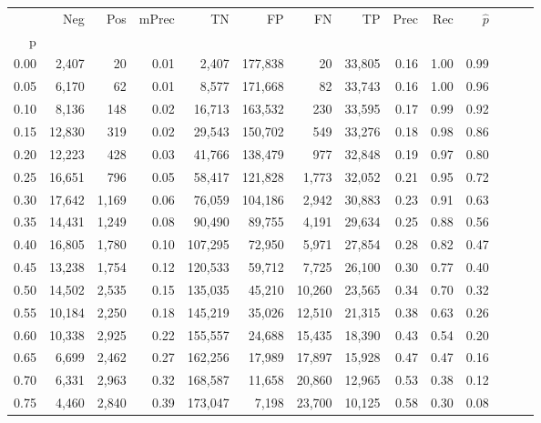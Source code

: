 \begin{tabular}{rrrrrrrrrrrrrr}
\toprule
{} &     Neg &    Pos & mPrec &       TN &       FP &      FN &      TP &  Prec &   Rec & $\hat{p}$ \\
p    &         &        &       &          &          &         &         &       &       &           \\
\midrule
0.00 &   2,407 &     20 &  0.01 &    2,407 &  177,838 &      20 &  33,805 &  0.16 &  1.00 &      0.99 \\
0.05 &   6,170 &     62 &  0.01 &    8,577 &  171,668 &      82 &  33,743 &  0.16 &  1.00 &      0.96 \\
0.10 &   8,136 &    148 &  0.02 &   16,713 &  163,532 &     230 &  33,595 &  0.17 &  0.99 &      0.92 \\
0.15 &  12,830 &    319 &  0.02 &   29,543 &  150,702 &     549 &  33,276 &  0.18 &  0.98 &      0.86 \\
0.20 &  12,223 &    428 &  0.03 &   41,766 &  138,479 &     977 &  32,848 &  0.19 &  0.97 &      0.80 \\
0.25 &  16,651 &    796 &  0.05 &   58,417 &  121,828 &   1,773 &  32,052 &  0.21 &  0.95 &      0.72 \\
0.30 &  17,642 &  1,169 &  0.06 &   76,059 &  104,186 &   2,942 &  30,883 &  0.23 &  0.91 &      0.63 \\
0.35 &  14,431 &  1,249 &  0.08 &   90,490 &   89,755 &   4,191 &  29,634 &  0.25 &  0.88 &      0.56 \\
0.40 &  16,805 &  1,780 &  0.10 &  107,295 &   72,950 &   5,971 &  27,854 &  0.28 &  0.82 &      0.47 \\
0.45 &  13,238 &  1,754 &  0.12 &  120,533 &   59,712 &   7,725 &  26,100 &  0.30 &  0.77 &      0.40 \\
0.50 &  14,502 &  2,535 &  0.15 &  135,035 &   45,210 &  10,260 &  23,565 &  0.34 &  0.70 &      0.32 \\
0.55 &  10,184 &  2,250 &  0.18 &  145,219 &   35,026 &  12,510 &  21,315 &  0.38 &  0.63 &      0.26 \\
0.60 &  10,338 &  2,925 &  0.22 &  155,557 &   24,688 &  15,435 &  18,390 &  0.43 &  0.54 &      0.20 \\
0.65 &   6,699 &  2,462 &  0.27 &  162,256 &   17,989 &  17,897 &  15,928 &  0.47 &  0.47 &      0.16 \\
0.70 &   6,331 &  2,963 &  0.32 &  168,587 &   11,658 &  20,860 &  12,965 &  0.53 &  0.38 &      0.12 \\
0.75 &   4,460 &  2,840 &  0.39 &  173,047 &    7,198 &  23,700 &  10,125 &  0.58 &  0.30 &      0.08 \\

\end{tabular}
